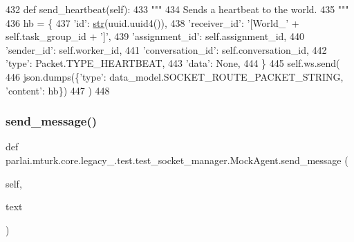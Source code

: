 \begin{DoxyCode}
432     \textcolor{keyword}{def }send\_heartbeat(self):
433         \textcolor{stringliteral}{"""}
434 \textcolor{stringliteral}{        Sends a heartbeat to the world.}
435 \textcolor{stringliteral}{        """}
436         hb = \{
437             \textcolor{stringliteral}{'id'}: \hyperlink{namespacegenerate__task__READMEs_a5b88452ffb87b78c8c85ececebafc09f}{str}(uuid.uuid4()),
438             \textcolor{stringliteral}{'receiver\_id'}: \textcolor{stringliteral}{'[World\_'} + self.task\_group\_id + \textcolor{stringliteral}{']'},
439             \textcolor{stringliteral}{'assignment\_id'}: self.assignment\_id,
440             \textcolor{stringliteral}{'sender\_id'}: self.worker\_id,
441             \textcolor{stringliteral}{'conversation\_id'}: self.conversation\_id,
442             \textcolor{stringliteral}{'type'}: Packet.TYPE\_HEARTBEAT,
443             \textcolor{stringliteral}{'data'}: \textcolor{keywordtype}{None},
444         \}
445         self.ws.send(
446             json.dumps(\{\textcolor{stringliteral}{'type'}: data\_model.SOCKET\_ROUTE\_PACKET\_STRING, \textcolor{stringliteral}{'content'}: hb\})
447         )
448 
\end{DoxyCode}
\mbox{\label{classparlai_1_1mturk_1_1core_1_1legacy__2018_1_1test_1_1test__socket__manager_1_1MockAgent_ac8b15287750a3cfc08b06d3ea46bbe0e}} 
\subsubsection{\texorpdfstring{send\+\_\+message()}{send\_message()}}
{\footnotesize\ttfamily def parlai.\+mturk.\+core.\+legacy\+\_.\+test.\+test\+\_\+socket\+\_\+manager.\+Mock\+Agent.\+send\+\_\+message (\begin{DoxyParamCaption}\item[{}]{self,  }\item[{}]{text }\end{DoxyParamCaption})}



